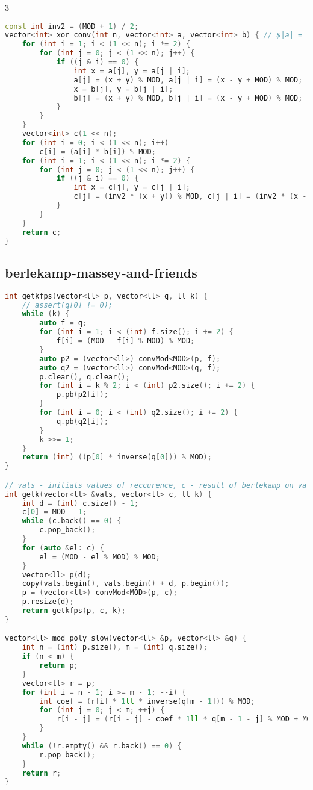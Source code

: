 \documentclass[9pt,a4paper,landscape,twosided]{extarticle}
\begin{document}
\begin{multicols*}{3}
\begin{lstlisting}[language=C++]
const int inv2 = (MOD + 1) / 2;
vector<int> xor_conv(int n, vector<int> a, vector<int> b) { // $|a| = |b| = 2^n$
    for (int i = 1; i < (1 << n); i *= 2) {
        for (int j = 0; j < (1 << n); j++) {
            if ((j & i) == 0) {
                int x = a[j], y = a[j | i];
                a[j] = (x + y) % MOD, a[j | i] = (x - y + MOD) % MOD;
                x = b[j], y = b[j | i];
                b[j] = (x + y) % MOD, b[j | i] = (x - y + MOD) % MOD;
            }
        }
    }
    vector<int> c(1 << n);
    for (int i = 0; i < (1 << n); i++)
        c[i] = (a[i] * b[i]) % MOD;
    for (int i = 1; i < (1 << n); i *= 2) {
        for (int j = 0; j < (1 << n); j++) {
            if ((j & i) == 0) {
                int x = c[j], y = c[j | i];
                c[j] = (inv2 * (x + y)) % MOD, c[j | i] = (inv2 * (x - y + MOD)) % MOD;
            }
        }
    }
    return c;
}
\end{lstlisting}

\subsection{berlekamp-massey-and-friends}
\begin{lstlisting}[language=C++]
int getkfps(vector<ll> p, vector<ll> q, ll k) {
    // assert(q[0] != 0);
    while (k) {
        auto f = q;
        for (int i = 1; i < (int) f.size(); i += 2) {
            f[i] = (MOD - f[i] % MOD) % MOD;
        }
        auto p2 = (vector<ll>) convMod<MOD>(p, f);
        auto q2 = (vector<ll>) convMod<MOD>(q, f);
        p.clear(), q.clear();
        for (int i = k % 2; i < (int) p2.size(); i += 2) {
            p.pb(p2[i]);
        }
        for (int i = 0; i < (int) q2.size(); i += 2) {
            q.pb(q2[i]);
        }
        k >>= 1;
    }
    return (int) ((p[0] * inverse(q[0])) % MOD);
}

// vals - initials values of reccurence, c - result of berlekamp on vals
int getk(vector<ll> &vals, vector<ll> c, ll k) {
    int d = (int) c.size() - 1;
    c[0] = MOD - 1;
    while (c.back() == 0) {
        c.pop_back();
    }
    for (auto &el: c) {
        el = (MOD - el % MOD) % MOD;
    }
    vector<ll> p(d);
    copy(vals.begin(), vals.begin() + d, p.begin());
    p = (vector<ll>) convMod<MOD>(p, c);
    p.resize(d);
    return getkfps(p, c, k);
}

vector<ll> mod_poly_slow(vector<ll> &p, vector<ll> &q) {
    int n = (int) p.size(), m = (int) q.size();
    if (n < m) {
        return p;
    }
    vector<ll> r = p;
    for (int i = n - 1; i >= m - 1; --i) {
        int coef = (r[i] * 1ll * inverse(q[m - 1])) % MOD;
        for (int j = 0; j < m; ++j) {
            r[i - j] = (r[i - j] - coef * 1ll * q[m - 1 - j] % MOD + MOD) % MOD;
        }
    }
    while (!r.empty() && r.back() == 0) {
        r.pop_back();
    }
    return r;
}


\end{lstlisting}
\end{multicols*}
\end{document}
